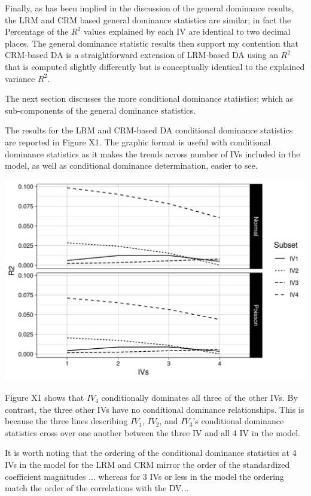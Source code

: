 \documentclass[ShortAfour,times,sageapa]{sagej}
\begin{document}
	Finally, as has been implied in the discussion of the general dominance results, the LRM and CRM based general dominance statistics are similar; in fact the Percentage of the $R^2$ values explained by each IV are identical to two decimal places.
	The general dominance statistic results then support my contention that CRM-based DA is a straightforward extension of LRM-based DA using an $R^2$ that is computed slightly differently but is conceptually identical to the explained variance $R^2$.
	
	The next section discusses the more conditional dominance statistics; which as sub-components of the general dominance statistics.
	
	The results for the LRM and CRM-based DA conditional dominance statistics are reported in Figure X1. 
	The graphic format is useful with conditional dominance statistics as it makes the trends across number of IVs included in the model, as well as conditional dominance determination, easier to see.
	 
	\includegraphics{includes/condit_gph}
	
	Figure X1 shows that $IV_4$ conditionally dominates all three of the other IVs.
	By contrast, the three other IVs have no conditional dominance relationships.
	This is because the three lines describing $IV_1$, $IV_2$, and $IV_3$'s conditional dominance statistics cross over one another between the three IV and all 4 IV in the model.
	
	It is worth noting that the ordering of the conditional dominance statistics at 4 IVs in the model for the LRM and CRM mirror the order of the standardized coefficient magnitudes ... whereas for 3 IVs or less in the model the ordering match the order of the correlations with the DV...
	
\end{document}
